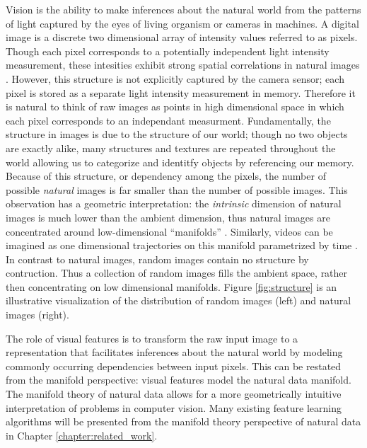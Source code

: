 Vision is the ability to make inferences about the natural world from the
patterns of light captured by the eyes of living organism or cameras in
machines. A digital image is a discrete two dimensional array of intensity
values referred to as pixels. Though each pixel corresponds to a potentially
independent light intensity measurement, these intesities exhibit strong
spatial correlations in natural images \cite{simoncelli2001}.  However, this
structure is not explicitly captured by the camera sensor; each pixel is stored
as a separate light intensity measurement in memory. Therefore it is natural to
think of raw images as points in high dimensional space in which each pixel
corresponds to an independant measurment. Fundamentally, the structure in images
is due to the structure of our world; though no two objects are exactly alike,
many structures and textures are repeated throughout the world allowing us to
categorize and identitfy objects by referencing our memory.  Because of this
structure, or dependency among the pixels, the number of possible
\emph{natural} images is far smaller than the number of possible images.  This
observation has a geometric interpretation: the \emph{intrinsic} dimension of
natural images is much lower than the ambient dimension, thus natural images
are concentrated around low-dimensional ``manifolds''
\cite{bengio2013,tenenbaum2000,roweis2000}. Similarly, videos can be imagined
as one dimensional trajectories on this manifold parametrized by time
\cite{goroshin2015}. In contrast to natural images, random images contain no
structure by contruction. Thus a collection of random images fills the ambient
space, rather then concentrating on low dimensional manifolds.  Figure
\ref{fig:structure} is an illustrative visualization of the distribution of
random images (left) and natural images (right). 

The role of visual features is to transform the raw input image to a
representation that facilitates inferences about the natural world by modeling
commonly occurring dependencies between input pixels. This can be restated from
the manifold perspective: visual features model the natural data manifold.  The
manifold theory of natural data allows for a more geometrically intuitive
interpretation of problems in computer vision. Many existing feature learning
algorithms will be presented from the manifold theory perspective of natural
data in Chapter \ref{chapter:related_work}. 

